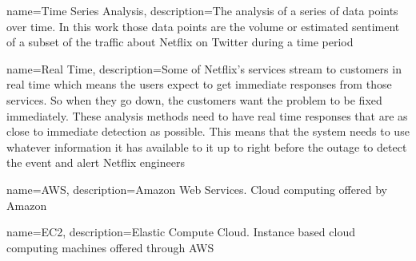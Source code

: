\documentclass[12pt]{ucthesis}
\begin{document}



      {name={Time Series Analysis},
       description={The analysis of a series of data points over time. In this work those data
                    points are the volume or estimated sentiment of a subset of the traffic about
                    Netflix on Twitter during a time period}}

      {name={Real Time},
       description={Some of Netflix's services stream to customers in real time which means the
                    users expect to get immediate responses from those services. So when
                    they go down, the customers want the problem to be fixed immediately. These
                    analysis methods need to have real time responses that are as close to
                    immediate detection as possible. This means that the system needs to use
                    whatever information it has available to it up to right before the outage to
                    detect the event and alert Netflix engineers}}

      {name={AWS},
       description={Amazon Web Services. Cloud computing offered by Amazon}}

      {name={EC2},
       description={Elastic Compute Cloud. Instance based cloud computing machines offered through AWS}}


\clearpage


\end{document}

